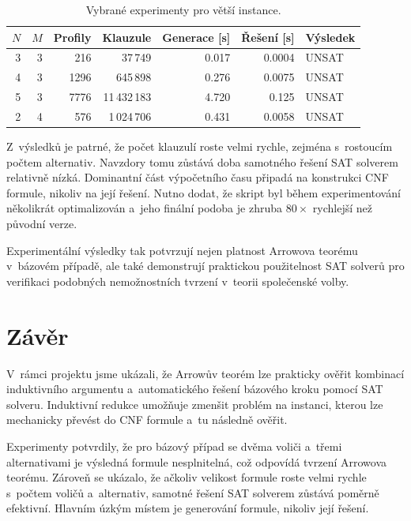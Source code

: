 \documentclass[a4paper, 11pt]{article}
\begin{document}
\begin{table}[h]
    \centering
    \begin{tabular}{rrrrrrl}
        \toprule
        $N$ & $M$ & Profily & Klauzule     & Generace [s] & Řešení [s] & Výsledek \\
        \midrule
        3   & 3   & 216     & 37\,749      & 0.017        & 0.0004     & UNSAT    \\
        4   & 3   & 1296    & 645\,898     & 0.276        & 0.0075     & UNSAT    \\
        5   & 3   & 7776    & 11\,432\,183 & 4.720        & 0.125      & UNSAT    \\
        2   & 4   & 576     & 1\,024\,706  & 0.431        & 0.0058     & UNSAT    \\
        \bottomrule
    \end{tabular}
    \caption{Vybrané experimenty pro větší instance.}
    \label{tab:scaling-results}
\end{table}

Z~výsledků je patrné, že počet klauzulí roste velmi rychle, zejména s~rostoucím počtem alternativ.
Navzdory tomu zůstává doba samotného řešení SAT solverem relativně nízká.
Dominantní část výpočetního času připadá na konstrukci CNF formule, nikoliv na její řešení.
Nutno dodat, že skript byl během experimentování několikrát optimalizován a~jeho finální podoba je zhruba $80\times$ rychlejší než původní verze.

Experimentální výsledky tak potvrzují nejen platnost Arrowova teorému v~bázovém případě, ale také demonstrují praktickou použitelnost SAT solverů pro verifikaci podobných nemožnostních tvrzení v~teorii společenské volby.


\section{Závěr}\label{sec:Conclusion}

V~rámci projektu jsme ukázali, že Arrowův teorém lze prakticky ověřit kombinací induktivního argumentu a~automatického řešení bázového kroku pomocí SAT solveru.
Induktivní redukce umožňuje zmenšit problém na instanci, kterou lze mechanicky převést do CNF formule a~tu následně ověřit.

Experimenty potvrdily, že pro bázový případ se dvěma voliči a~třemi alternativami je výsledná formule nesplnitelná, což odpovídá tvrzení Arrowova teorému.
Zároveň se ukázalo, že ačkoliv velikost formule roste velmi rychle s~počtem voličů a~alternativ, samotné řešení SAT solverem zůstává poměrně efektivní.
Hlavním úzkým místem je generování formule, nikoliv její řešení.
\end{document}
